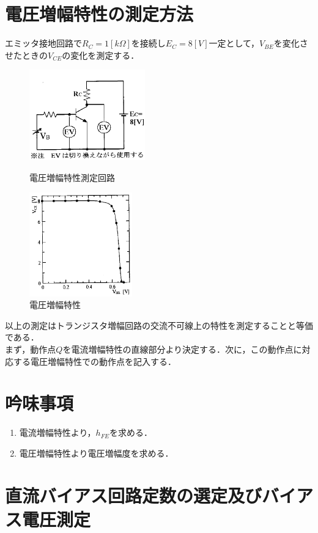 \documentclass[10pt, a4j, dvipdfmx]{jarticle}
\begin{document}
    \section*{電圧増幅特性の測定方法}
    エミッタ接地回路で$R_C = 1[k\Omega]$を接続し$E_C = 8[V]$一定として，$V_{BE}$を変化させたときの$V_{CE}$の変化を測定する．
    \begin{figure}[H]
        \begin{minipage}{0.5\hsize}
            \centering
            \includegraphics[width=50mm]{fig-7.png}
            \caption{電圧増幅特性測定回路}
            \label{fig:7}
        \end{minipage}
        \begin{minipage}{0.5\hsize}
            \centering
            \includegraphics[height=45mm]{fig-8.png}
            \caption{電圧増幅特性}
            \label{fig:8}
        \end{minipage}
    \end{figure}

    以上の測定はトランジスタ増幅回路の交流不可線上の特性を測定することと等価である．\\
    まず，動作点$Q$を電流増幅特性の直線部分より決定する．次に，この動作点に対応する電圧増幅特性での動作点を記入する．

    \section*{吟味事項}
    \begin{enumerate}
        \item 電流増幅特性より，$h_{FE}$を求める．
        \item 電圧増幅特性より電圧増幅度を求める．
    \end{enumerate}

    \newpage
    \section*{直流バイアス回路定数の選定及びバイアス電圧測定}
\end{document}
